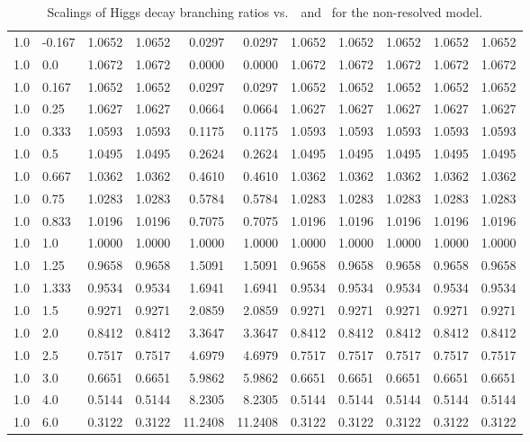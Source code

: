 \begin{table}[h!]
\begin{tabular}{ll rrrrrrrrr}
   1.0  & -0.167 & 1.0652 & 1.0652 & 0.0297     & 0.0297    & 1.0652 & 1.0652 & 1.0652          & 1.0652     & 1.0652 \\
   1.0  & 0.0    & 1.0672 & 1.0672 & 0.0000     & 0.0000    & 1.0672 & 1.0672 & 1.0672          & 1.0672     & 1.0672 \\
   1.0  & 0.167  & 1.0652 & 1.0652 & 0.0297     & 0.0297    & 1.0652 & 1.0652 & 1.0652          & 1.0652     & 1.0652 \\
   1.0  & 0.25   & 1.0627 & 1.0627 & 0.0664     & 0.0664    & 1.0627 & 1.0627 & 1.0627          & 1.0627     & 1.0627 \\
   1.0  & 0.333  & 1.0593 & 1.0593 & 0.1175     & 0.1175    & 1.0593 & 1.0593 & 1.0593          & 1.0593     & 1.0593 \\
   1.0  & 0.5    & 1.0495 & 1.0495 & 0.2624     & 0.2624    & 1.0495 & 1.0495 & 1.0495          & 1.0495     & 1.0495 \\
   1.0  & 0.667  & 1.0362 & 1.0362 & 0.4610     & 0.4610    & 1.0362 & 1.0362 & 1.0362          & 1.0362     & 1.0362 \\
   1.0  & 0.75   & 1.0283 & 1.0283 & 0.5784     & 0.5784    & 1.0283 & 1.0283 & 1.0283          & 1.0283     & 1.0283 \\
   1.0  &  0.833 & 1.0196 & 1.0196 & 0.7075     & 0.7075    & 1.0196 & 1.0196 & 1.0196          & 1.0196     & 1.0196 \\
   1.0  & 1.0    & 1.0000 & 1.0000 & 1.0000     & 1.0000    & 1.0000 & 1.0000 & 1.0000          & 1.0000     & 1.0000 \\
   1.0  & 1.25   & 0.9658 & 0.9658 & 1.5091     & 1.5091    & 0.9658 & 0.9658 & 0.9658          & 0.9658     & 0.9658 \\
   1.0  & 1.333  & 0.9534 & 0.9534 & 1.6941     & 1.6941    & 0.9534 & 0.9534 & 0.9534          & 0.9534     & 0.9534 \\
   1.0  & 1.5    & 0.9271 & 0.9271 & 2.0859     & 2.0859    & 0.9271 & 0.9271 & 0.9271          & 0.9271     & 0.9271 \\
   1.0  & 2.0    & 0.8412 & 0.8412 & 3.3647     & 3.3647    & 0.8412 & 0.8412 & 0.8412          & 0.8412     & 0.8412 \\
   1.0  & 2.5    & 0.7517 & 0.7517 & 4.6979     & 4.6979    & 0.7517 & 0.7517 & 0.7517          & 0.7517     & 0.7517 \\
   1.0  & 3.0    & 0.6651 & 0.6651 & 5.9862     & 5.9862    & 0.6651 & 0.6651 & 0.6651          & 0.6651     & 0.6651 \\
   1.0  & 4.0    & 0.5144 & 0.5144 & 8.2305     & 8.2305    & 0.5144 & 0.5144 & 0.5144          & 0.5144     & 0.5144 \\
   1.0  & 6.0    & 0.3122 & 0.3122 & 11.2408    & 11.2408   & 0.3122 & 0.3122 & 0.3122          & 0.3122     & 0.3122 \\\hline
    \end{tabular}
    \caption{Scalings of Higgs decay branching ratios vs.\ \Ct\ and \ for the non-resolved model.}\label{tab:brscalingK6_1}
 \end{table}

